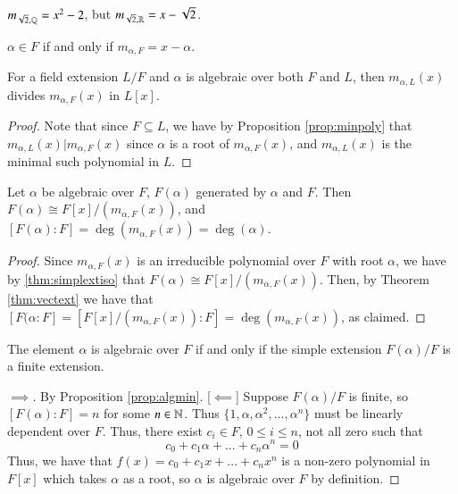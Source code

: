 \begin{example}
    $m_{\sqrt{2},\mathbb Q} = x^2-2$, but $m_{\sqrt{2},\mathbb R} = x-\sqrt{2}$.
\end{example}

\begin{corollary}
    $\alpha \in F$ if and only if $m_{\alpha,F} = x-\alpha$.
\end{corollary}


\begin{corollary}
    For a field extension $L/F$ and $\alpha$ is algebraic over both $F$ and $L$, then $m_{\alpha,L}(x)$ divides $m_{\alpha,F}(x)$ in $L[x]$.
\end{corollary}
\begin{proof}
    Note that since $F\subseteq L$, we have by Proposition \ref{prop:minpoly} that $m_{\alpha,L}(x) \vert m_{\alpha,F}(x)$ since $\alpha$ is a root of $m_{\alpha,F}(x)$, and $m_{\alpha,L}(x)$ is the minimal such polynomial in $L$.
\end{proof}



\begin{proposition}\label{prop:algmin}
    Let $\alpha$ be algebraic over $F$, $F(\alpha)$ generated by $\alpha$ and $F$. Then $F(\alpha) \cong F[x]/(m_{\alpha,F}(x))$, and $[F(\alpha):F] = \deg(m_{\alpha,F}(x)) = \deg(\alpha)$.
\end{proposition}
\begin{proof}
    Since $m_{\alpha,F}(x)$ is an irreducible polynomial over $F$ with root $\alpha$, we have by \ref{thm:simplextiso} that $F(\alpha) \cong F[x]/(m_{\alpha,F}(x))$. Then, by Theorem \ref{thm:vectext} we have that $[F(\alpha:F] = [F[x]/(m_{\alpha,F}(x)):F] = \deg(m_{\alpha,F}(x))$, as claimed.
\end{proof}



\begin{proposition}
    The element $\alpha$ is algebraic over $F$ if and only if the simple extension $F(\alpha)/F$ is a finite extension.
\end{proposition}
\begin{proof}
    [$\implies$] By Proposition \ref{prop:algmin}.
    [$\impliedby$] Suppose $F(\alpha)/F$ is finite, so $[F(\alpha):F] = n$ for some $n \in \mathbb N$. Thus $\{1,\alpha,\alpha^2,...,\alpha^n\}$ must be linearly dependent over $F$. Thus, there exist $c_i \in F$, $0 \leq i \leq n$, not all zero such that \begin{equation*}
        c_0 + c_1\alpha + ... + c_n\alpha^n = 0
    \end{equation*}
    Thus, we have that $f(x) = c_0+c_1x+...+c_nx^n$ is a non-zero polynomial in $F[x]$ which takes $\alpha$ as a root, so $\alpha$ is algebraic over $F$ by definition.
\end{proof}

